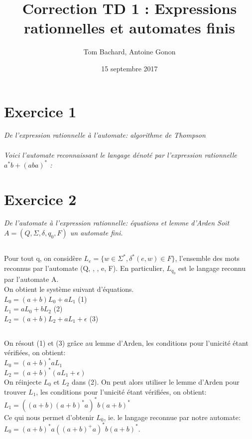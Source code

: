 \documentclass[a4paper,11pt]{article}%
\begin{document}
\title{Correction TD 1 : Expressions rationnelles et automates finis}

\author{Tom Bachard, Antoine Gonon}

\date{15 septembre 2017}

\maketitle


\section*{\bf{Exercice 1 }}%
\it
De l'expression rationnelle à l'automate: algorithme de Thompson
\\
\\
\rm
Voici l'automate reconnaissant le langage dénoté par l'expression rationnelle
\it
$a^*b+(aba)^*$
\rm
: %

\section*{\bf{Exercice 2 }}%
\it
De l'automate à l'expression rationnelle: équations et lemme d'Arden
\rm{Soit $A=(Q, \Sigma, \delta, q_0, F)$ un automate fini.}
\\
\subsection{}
Pour tout q\in \Q, on considère $L_e=\{w\in \Sigma^*, \delta^*(e,w)\in F\}$, l'ensemble des mots reconnus par l'automate (Q, \Sigma, \delta, e, F). En particulier, $L_{q_0}$ est le langage reconnu par l'automate A.
\\
On obtient le système suivant d'équations.
\\
$L_0=(a+b)L_0+aL_1$ (1)\\
$L_1=aL_0+bL_2$ (2)\\
$L_2=(a+b)L_2+aL_1+\epsilon$ (3)\\

\subsection{}
On résout (1) et (3) grâce au lemme d'Arden, les conditions pour l'unicité étant vérifiées, on obtient: %
\\
$L_0=(a+b)^*aL_1$\\
$L_2=(a+b)^*(aL_1+\epsilon )$\\
On réinjecte $L_0$ et $L_2$ dans (2). On peut alors utiliser le lemme d'Arden pour trouver $L_1$, les conditions pour l'unicité étant vérifiées, on obtient:\\
$L_1=((a+b)(a+b)^*a)^*b(a+b)^*$\\
Ce qui nous permet d'obtenir $L_0$, ie. le langage reconnue par notre automate:\\
$L_0=(a+b)^*a((a+b)^+a)^*b(a+b)^*$.\\
\end{document}
